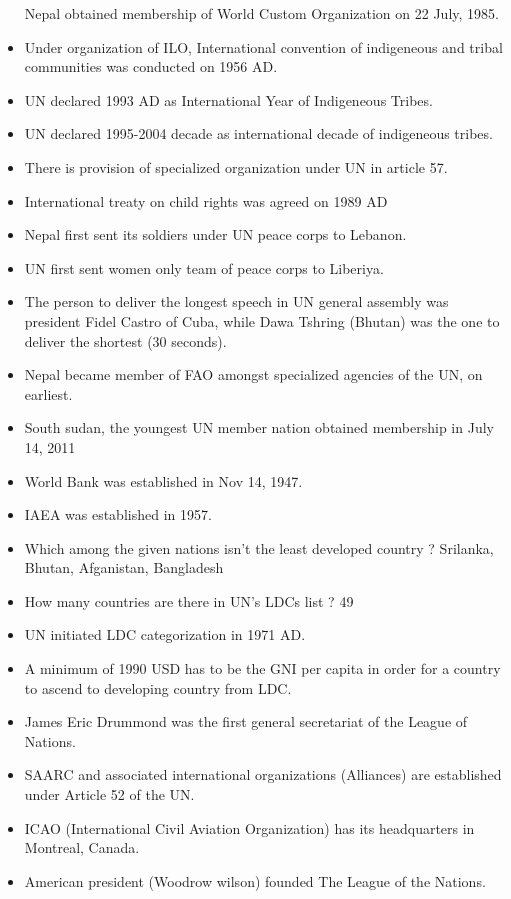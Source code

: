 \documentclass[
]{book}
\begin{document}
\begin{itemize}
  Nepal obtained membership of World Custom Organization on 22 July, 1985.
\item
  Under organization of ILO, International convention of indigeneous and tribal communities was conducted on 1956 AD.
\item
  UN declared 1993 AD as International Year of Indigeneous Tribes.
\item
  UN declared 1995-2004 decade as international decade of indigeneous tribes.
\item
  There is provision of specialized organization under UN in article 57.
\item
  International treaty on child rights was agreed on 1989 AD
\item
  Nepal first sent its soldiers under UN peace corps to Lebanon.
\item
  UN first sent women only team of peace corps to Liberiya.
\item
  The person to deliver the longest speech in UN general assembly was president Fidel Castro of Cuba, while Dawa Tshring (Bhutan) was the one to deliver the shortest (30 seconds).
\item
  Nepal became member of FAO amongst specialized agencies of the UN, on earliest.
\item
  South sudan, the youngest UN member nation obtained membership in July 14, 2011
\item
  World Bank was established in Nov 14, 1947.
\item
  IAEA was established in 1957.
\item
  Which among the given nations isn't the least developed country ? Srilanka, Bhutan, Afganistan, Bangladesh
\item
  How many countries are there in UN's LDCs list ? 49
\item
  UN initiated LDC categorization in 1971 AD.
\item
  A minimum of 1990 USD has to be the GNI per capita in order for a country to ascend to developing country from LDC.
\item
  James Eric Drummond was the first general secretariat of the League of Nations.
\item
  SAARC and associated international organizations (Alliances) are established under Article 52 of the UN.
\item
  ICAO (International Civil Aviation Organization) has its headquarters in Montreal, Canada.
\item
  American president (Woodrow wilson) founded The League of the Nations.

\end{itemize}
\end{document}
